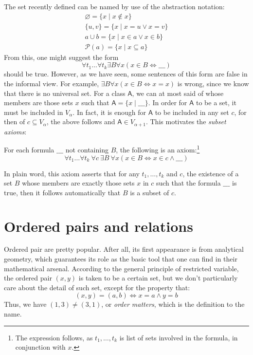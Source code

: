 The set recently defined can be named by use of the abstraction notation: 
\begin{align}
    \varnothing = \{x\mid x \not\in x\}\\
    \{u,v\} = \{x\mid x = u \lor x = v\}\\
    a \cup b = \{x\mid x\in a \lor x\in b\}\\
    \mathcal{P}(a) = \{x\mid x\subseteq a\}
\end{align}
From this, one might suggest the form \begin{equation}
    \forall t_{1}\dots\forall t_{k} \exists B \forall x (x\in B \Leftrightarrow \_ \_ \_)
\end{equation}
should be true. However, as we have seen, some sentences of this form are false in the informal view. For example, $\exists B \forall x (x\in B \Leftrightarrow x = x)$ is wrong, since we know that there is no universal set. For a class $\mathsf{A}$, we can at most said of whose members are those sets $x$ such that $\mathsf{A}=\{x\mid \_ \_ \_\}$. In order for $\mathsf{A}$ to be a set, it must be included in $V_{\alpha}$. In fact, it is enough for $\mathsf{A}$ to be included in any set $c$, for then of $c\subseteq V_{\alpha}$, the above follows and $\mathsf{A}\in V_{\alpha+1}$. This motivates the \textit{subset axioms}:
\begin{axiom}
    For each formula $\_\_\_$ not containing $B$, the following is an axiom:\footnote{The expression follows, as $t_{1},\dots, t_{k}$ is list of sets involved in the formula, in conjunction with $x$.} \begin{equation}
        \forall t_{1}\dots\forall t_{k}\: \forall c\:\exists B\: \forall x(x\in B \Leftrightarrow x\in c \land \_\_\_)
    \end{equation}
\end{axiom}
In plain word, this axiom asserts that for any $t_{1},\dots,t_{k}$ and $c$, the existence of a set $B$ whose members are exactly those sets $x$ in $c$ such that the formula $\_\_\_$ is true, then it follows automatically that $B$ is a subset of $c$. 

\section{Ordered pairs and relations}

Ordered pair are pretty popular. After all, its first appearance is from analytical geometry, which guarantees its role as the basic tool that one can find in their mathematical arsenal. According to the general principle of restricted variable, the ordered pair $(x,y)$ is taken to be a certain set, but we don't particularly care about the detail of such set, except for the property that: \begin{equation*}
    (x,y) = (a,b) \Leftrightarrow x = a \land y = b
\end{equation*}
Thus, we have $(1,3)\neq (3,1)$, or \textit{order matters}, which is the definition to the name. 

